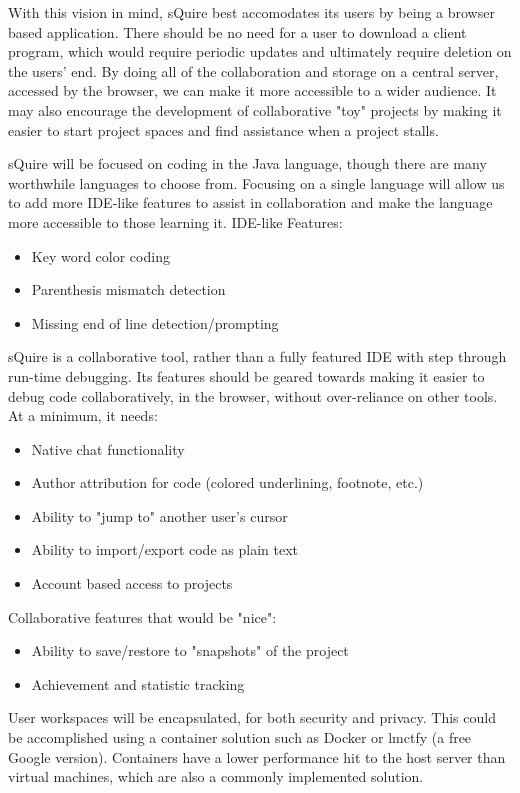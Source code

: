 \documentclass[11pt]{report}
\begin{document}
With this vision in mind, sQuire best accomodates its users by being a browser based application. There should be no need for a user to download a client program, which would require periodic updates and ultimately require deletion on the users' end. By doing all of the collaboration and storage on a central server, accessed by the browser, we can make it more accessible to a wider audience. It may also encourage the development of collaborative "toy" projects by making it easier to start project spaces and find assistance when a project stalls.

sQuire will be focused on coding in the Java language, though there are many worthwhile languages to choose from. Focusing on a single language will allow us to add more IDE-like features to assist in collaboration and make the language more accessible to those learning it.
IDE-like Features:
\begin{itemize}
  \item Key word color coding
  \item Parenthesis mismatch detection
  \item Missing end of line detection/prompting
\end{itemize}

sQuire is a collaborative tool, rather than a fully featured IDE with step through run-time debugging. Its features should be geared towards making it easier to debug code collaboratively, in the browser, without over-reliance on other tools. At a minimum, it needs:
\begin{itemize}
  \item Native chat functionality
  \item Author attribution for code (colored underlining, footnote, etc.)
  \item Ability to "jump to" another user's cursor
  \item Ability to import/export code as plain text
  \item Account based access to projects
\end{itemize}

Collaborative features that would be "nice":
\begin{itemize}
  \item Ability to save/restore to "snapshots" of the project
  \item Achievement and statistic tracking
\end{itemize}

User workspaces will be encapsulated, for both security and privacy. This could be accomplished using a container solution such as Docker or lmctfy (a free Google version). Containers have a lower performance hit to the host server than virtual machines, which are also a commonly implemented solution.  
\end{document}
